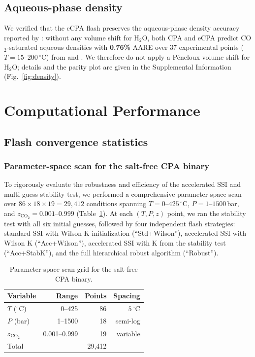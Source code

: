 \documentclass[preprint,12pt,authoryear]{elsarticle}
\begin{document}
\subsection{Aqueous-phase density}
\label{sec:density}

We verified that the eCPA flash preserves the aqueous-phase density accuracy reported by
\citet{Coelho2025}: without any volume shift for H$_2$O, both CPA and eCPA predict
CO$_2$-saturated aqueous densities with \textbf{0.76\%} AARE over 37 experimental points
($T = 15$--$200\,^\circ$C) from \citet{King1992} and \citet{Nighswander1989}.
We therefore do not apply a P\'eneloux volume shift for H$_2$O; details and the parity plot
are given in the Supplemental Information (Fig.~\ref{fig:density}).


\section{Computational Performance}
\label{sec:performance}

\subsection{Flash convergence statistics}
\label{sec:convergence}

\subsubsection{Parameter-space scan for the salt-free CPA binary}

To rigorously evaluate the robustness and efficiency of the accelerated SSI and
multi-guess stability test, we performed a comprehensive parameter-space scan over
$86 \times 18 \times 19 = 29{,}412$ conditions spanning
$T = 0$--$425\,^\circ$C, $P = 1$--$1500$\,bar, and
$z_{\text{CO}_2} = 0.001$--$0.999$ (Table~\ref{tab:scan_grid}).
At each $(T, P, z)$ point, we ran the stability test with all six initial guesses,
followed by four independent flash strategies:
standard SSI with Wilson K initialization (``Std+Wilson''),
accelerated SSI with Wilson K (``Acc+Wilson''),
accelerated SSI with K from the stability test (``Acc+StabK''),
and the full hierarchical robust algorithm (``Robust'').

\begin{table}[H]
  \centering
  \caption{Parameter-space scan grid for the salt-free CPA binary.}
  \label{tab:scan_grid}
  \begin{tabular}{lrrr}
    \toprule
    Variable & Range & Points & Spacing \\
    \midrule
    $T$ ($^\circ$C)      & 0--425    & 86 & $5\,^\circ$C \\
    $P$ (bar)            & 1--1500   & 18 & semi-log \\
    $z_{\text{CO}_2}$    & 0.001--0.999 & 19 & variable \\
    \midrule
    Total                &           & 29{,}412 & \\
    \bottomrule
  \end{tabular}
\end{table}
\end{document}
